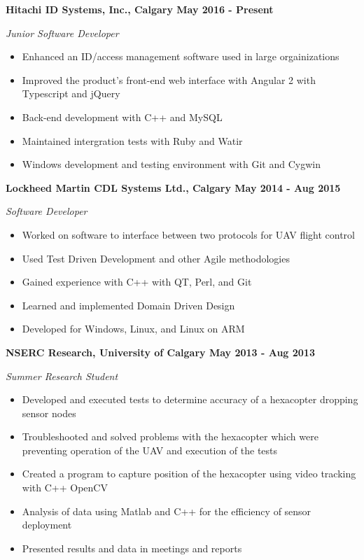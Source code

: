 \documentclass[12pt]{article}
\begin{document}
\bigskip
{}
\medskip

\noindent \centerline{ \bf Hitachi ID Systems, Inc., Calgary \hfill May 2016 - Present}
\indent \emph{ Junior Software Developer }
\begin{itemize}
  \item Enhanced an ID/access management software used in large orgainizations
  \item Improved the product's front-end web interface with Angular 2 with Typescript and jQuery 
  \item Back-end development with C++ and MySQL
  \item Maintained intergration tests with Ruby and Watir
  \item Windows development and testing environment with Git and Cygwin
\end{itemize}

\noindent \centerline{ \bf Lockheed Martin CDL Systems Ltd., Calgary \hfill May 2014 - Aug 2015}
\indent \emph{ Software Developer }
\begin{itemize}
  \item Worked on software to interface between two protocols for UAV flight control
  \item Used Test Driven Development and other Agile methodologies
  \item Gained experience with C++ with QT, Perl, and Git
  \item Learned and implemented Domain Driven Design
  \item Developed for Windows, Linux, and Linux on ARM
\end{itemize}

\noindent \centerline{ \bf NSERC Research, University of Calgary \hfill May 2013 - Aug 2013}
\indent \emph{ Summer Research Student }
\begin{itemize}
  \item Developed and executed tests to determine accuracy of a hexacopter dropping sensor nodes
  \item Troubleshooted and solved problems with the hexacopter which were preventing operation of the UAV and execution of the tests
  \item Created a program to capture position of the hexacopter using video tracking with C++ OpenCV
  \item Analysis of data using Matlab and C++ for the efficiency of sensor deployment
  \item Presented results and data in meetings and reports
\end{itemize}
\end{document}
